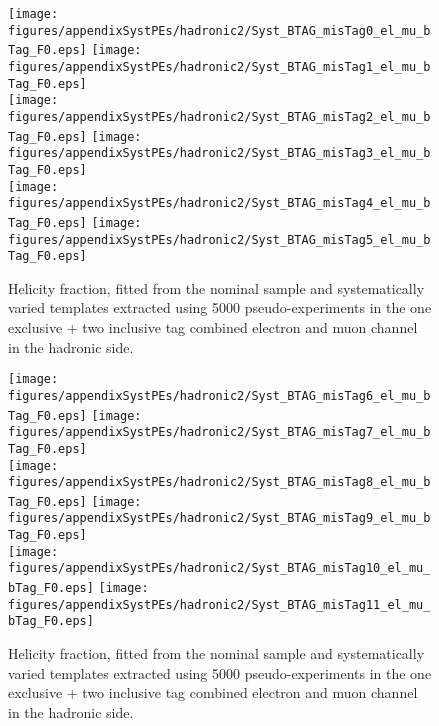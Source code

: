 \begin{figure}[!hb]
\begin{center}
        \texttt{[image: figures/appendixSystPEs/hadronic2/Syst\_BTAG\_misTag0\_el\_mu\_bTag\_F0.eps]}
        \texttt{[image: figures/appendixSystPEs/hadronic2/Syst\_BTAG\_misTag1\_el\_mu\_bTag\_F0.eps]}\\
        \texttt{[image: figures/appendixSystPEs/hadronic2/Syst\_BTAG\_misTag2\_el\_mu\_bTag\_F0.eps]}
        \texttt{[image: figures/appendixSystPEs/hadronic2/Syst\_BTAG\_misTag3\_el\_mu\_bTag\_F0.eps]}\\
        \texttt{[image: figures/appendixSystPEs/hadronic2/Syst\_BTAG\_misTag4\_el\_mu\_bTag\_F0.eps]}
        \texttt{[image: figures/appendixSystPEs/hadronic2/Syst\_BTAG\_misTag5\_el\_mu\_bTag\_F0.eps]}
        
\caption{Helicity fraction, \fo fitted from the nominal \ttbar sample and systematically varied templates extracted using 5000 pseudo-experiments in the one exclusive + two inclusive \bt tag combined electron and muon channel in the hadronic side. }
\label{fig:systematicVar_lep_f0_elmu2incl_btag3_1}
\end{center}
\end{figure}

\begin{figure}[!hb]
\begin{center}
        \texttt{[image: figures/appendixSystPEs/hadronic2/Syst\_BTAG\_misTag6\_el\_mu\_bTag\_F0.eps]}
        \texttt{[image: figures/appendixSystPEs/hadronic2/Syst\_BTAG\_misTag7\_el\_mu\_bTag\_F0.eps]}\\
        \texttt{[image: figures/appendixSystPEs/hadronic2/Syst\_BTAG\_misTag8\_el\_mu\_bTag\_F0.eps]}
        \texttt{[image: figures/appendixSystPEs/hadronic2/Syst\_BTAG\_misTag9\_el\_mu\_bTag\_F0.eps]}\\
        \texttt{[image: figures/appendixSystPEs/hadronic2/Syst\_BTAG\_misTag10\_el\_mu\_bTag\_F0.eps]}
        \texttt{[image: figures/appendixSystPEs/hadronic2/Syst\_BTAG\_misTag11\_el\_mu\_bTag\_F0.eps]}
        
\caption{Helicity fraction, \fo fitted from the nominal \ttbar sample and systematically varied templates extracted using 5000 pseudo-experiments in the one exclusive + two inclusive \bt tag combined electron and muon channel in the hadronic side. }
\label{fig:systematicVar_lep_f0_elmu2incl_btag3_2}
\end{center}
\end{figure}

